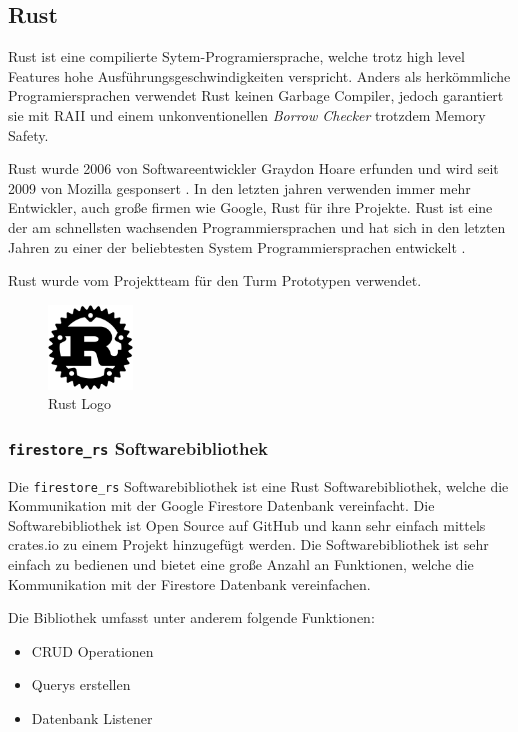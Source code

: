\subsection{Rust}
\label{sec:rust}

Rust ist eine compilierte Sytem-Programiersprache, welche trotz high level Features hohe Ausführungsgeschwindigkeiten verspricht. Anders als herkömmliche Programiersprachen verwendet Rust keinen Garbage Compiler, jedoch garantiert sie mit \ac{RAII} und einem unkonventionellen \textit{Borrow Checker} trotzdem Memory Safety.


Rust wurde 2006 von Softwareentwickler Graydon Hoare erfunden und wird seit 2009 von Mozilla gesponsert . In den letzten jahren verwenden immer mehr Entwickler, auch große firmen wie Google, Rust für ihre Projekte. Rust ist eine der am schnellsten wachsenden Programmiersprachen und hat sich in den letzten Jahren zu einer der beliebtesten System Programmiersprachen entwickelt .

Rust wurde vom Projektteam für den Turm Prototypen verwendet.

\begin{figure}[H]
    \centering
    \includegraphics[width=0.20\textwidth]{images/rust_logo.png}
    \caption{Rust Logo}
    \label{fig:rust_logo}
\end{figure}

\subsubsection{\texttt{firestore\_rs} Softwarebibliothek}
\label{sec:firestore_rs}

Die \texttt{firestore\_rs} Softwarebibliothek ist eine Rust Softwarebibliothek, welche die Kommunikation mit der Google Firestore Datenbank vereinfacht. Die Softwarebibliothek ist Open Source auf GitHub und kann sehr einfach mittels crates.io zu einem Projekt hinzugefügt werden. Die Softwarebibliothek ist sehr einfach zu bedienen und bietet eine große Anzahl an Funktionen, welche die Kommunikation mit der Firestore Datenbank vereinfachen.

Die Bibliothek umfasst unter anderem folgende Funktionen:
\begin{itemize}
    \item \ac{CRUD} Operationen
    \item Querys erstellen
    \item Datenbank Listener
\end{itemize}

